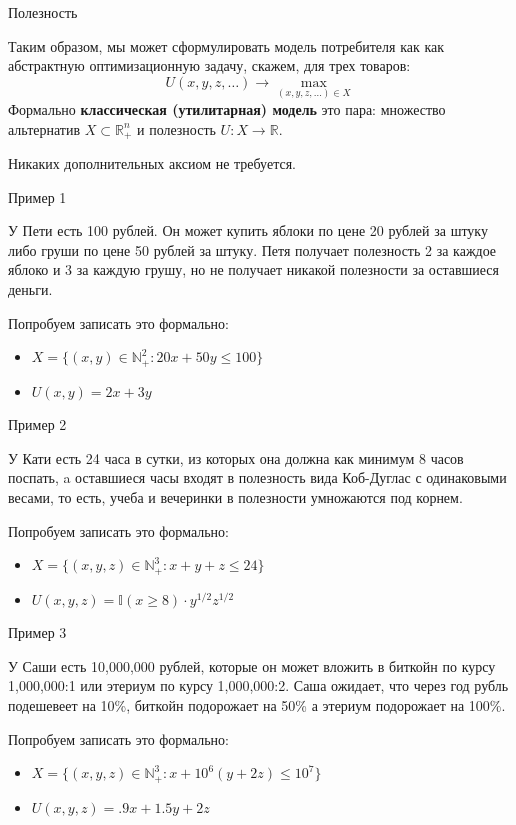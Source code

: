 \documentclass{beamer}
\begin{document}
\begin{frame}{Полезность}

Таким образом, мы может сформулировать модель потребителя как как абстрактную оптимизационную задачу, скажем, для трех товаров:
$$ U(x,y,z, \ldots) \to \max_{(x,y,z, \ldots) \in X}$$
Формально \textbf{классическая  (утилитарная) модель} это пара: множество альтернатив $X \subset \mathbb{R}^n_{+}$ и полезность $U: X \to \mathbb{R}$.

Никаких дополнительных аксиом не требуется.

\end{frame}

\begin{frame}{Пример 1}

У Пети есть 100 рублей. Он может купить яблоки по цене 20 рублей за штуку либо груши по цене 50 рублей за штуку. Петя получает полезность 2 за каждое яблоко и 3 за каждую грушу, но не получает никакой полезности за оставшиеся деньги. 

Попробуем записать это формально:

\begin{itemize}
  \item $X = \{(x, y) \in  \mathbb{N}^2_{+}: 20 x + 50 y \leqslant 100 \}$
  \item $U(x, y) = 2x + 3y$
\end{itemize}

\end{frame}

\begin{frame}{Пример 2}

У Кати есть 24 часа в сутки, из которых она должна как минимум 8 часов поспать, a оставшиеся часы входят в полезность вида Коб-Дуглас с одинаковыми весами, то есть, учеба и вечеринки в полезности умножаются под корнем.

Попробуем записать это формально:

\begin{itemize}
  \item $X = \{(x, y, z) \in  \mathbb{N}^3_{+}: x + y + z \leqslant 24 \}$
  \item $U(x, y, z) = \mathbb{I}(x \geqslant 8)\cdot y^{1/2}z^{1/2}$
\end{itemize}

\end{frame}

\begin{frame}{Пример 3}

У Саши есть 10,000,000 рублей, которые он может вложить в биткойн по курсу 1,000,000:1 или этериум по курсу 1,000,000:2. Саша ожидает, что через год рубль подешевеет на 10\%, биткойн подорожает на 50\% а этериум подорожает на 100\%.

Попробуем записать это формально:

\begin{itemize}
  \item $X = \{(x, y, z) \in  \mathbb{N}^3_{+}: x + 10^6 (y + 2 z) \leqslant 10^7 \}$
  \item $U(x, y, z) = .9 x + 1.5 y + 2 z$
\end{itemize}

\end{frame}
\end{document}

